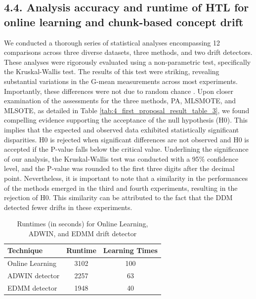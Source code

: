\subsection{4.4.	Analysis accuracy and runtime of HTL for online learning and chunk-based concept drift}
We conducted a thorough series of statistical analyses encompassing 12 comparisons across three diverse datasets, three methods, and two drift detectors. These analyses were rigorously evaluated using a non-parametric test, specifically the Kruskal-Wallis test. The results of this test were striking, revealing substantial variations in the G-mean measurements across most experiments. Importantly, these differences were not due to random chance \cite{yamada2013change}. Upon closer examination of the assessments for the three methods, PA, MLSMOTE, and MLSOTE, as detailed in Table \ref{tab:4_first_proposal_result_table_3}, we found compelling evidence supporting the acceptance of the null hypothesis (H0).
This implies that the expected and observed data exhibited statistically significant disparities. H0 is rejected when significant differences are not observed and H0 is accepted if the P-value falls below the critical value. Underlining the significance of our analysis, the Kruskal-Wallis test was conducted with a 95\% confidence level, and the P-value was rounded to the first three digits after the decimal point. Nevertheless, it is important to note that a similarity in the performances of the methods emerged in the third and fourth experiments, resulting in the rejection of H0. This similarity can be attributed to the fact that the DDM detected fewer drifts in these experiments.

\begin{table}[h]
  \centering
  \begin{tabular}{|l|c|c|}
  \hline
  \textbf{Technique}       & \textbf{Runtime} & \textbf{Learning Times} \\ \hline
  Online Learning          & 3102             & 100                     \\ \hline
  ADWIN detector           & 2257             & 63                      \\ \hline
  EDMM detector            & 1948             & 40                      \\ \hline
  \end{tabular}
  \caption{Runtimes (in seconds) for Online Learning, ADWIN, and EDMM drift detector}
  \label{table:6_table4}
  \end{table}
  